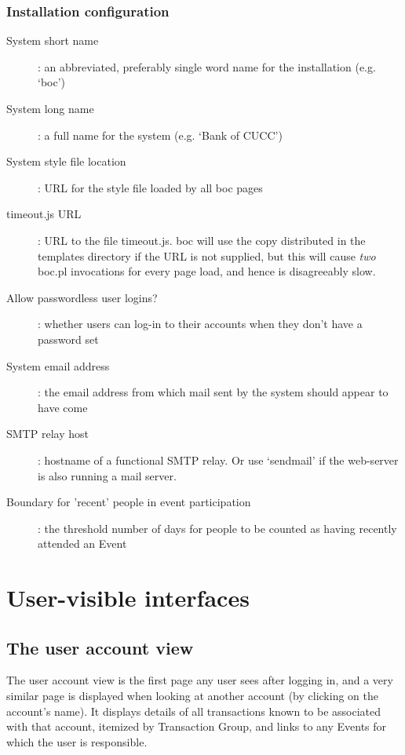 \documentclass{report}
\begin{document}
\subsection{Installation configuration}\label{inst_cfg}

\begin{description}
\item[System short name]: an abbreviated, preferably single word name for the installation (e.g. `boc')

\item[System long name]: a full name for the system (e.g. `Bank of CUCC')

\item[System style file location]: URL for the style file loaded by all boc pages

\item[timeout.js URL]: URL to the file timeout.js.  boc will use the copy distributed in the templates directory if the URL is not supplied, but this will cause \emph{two} boc.pl invocations for every page load, and hence is disagreeably slow.

\item[Allow passwordless user logins?]: whether users can log-in to their accounts when they don't have a password set

\item[System email address]: the email address from which mail sent by the system should appear to have come

\item[SMTP relay host]: hostname of a functional SMTP relay.  Or use `sendmail' if the web-server is also running a mail server.

\item[Boundary for 'recent' people in event participation]: the threshold number of days for people to be counted as having recently attended an Event
\end{description}

\chapter{User-visible interfaces}

\section{The user account view}

The user account view is the first page any user sees after logging in, and a very similar page is displayed when looking at another account (by clicking on the account's name).  It displays details of all transactions known to be associated with that account, itemized by Transaction Group, and links to any Events for which the user is responsible.
\end{document}

